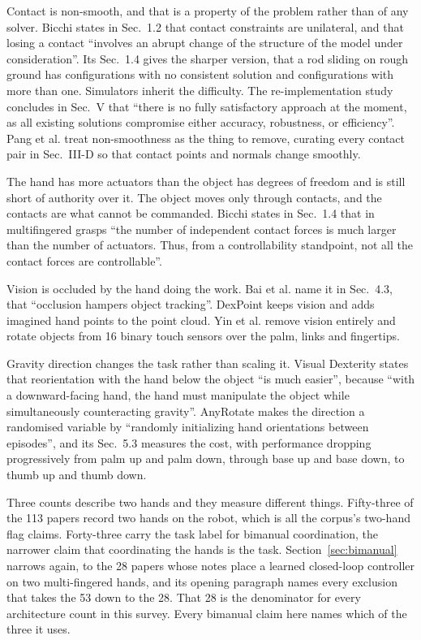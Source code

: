 Contact is non-smooth, and that is a property of the problem rather than of any solver. Bicchi
\cite{bicchi_grasping_chapter_2001} states in Sec.~1.2 that contact constraints are unilateral,
and that losing a contact ``involves an abrupt change of the structure of the model under
consideration''. Its Sec.~1.4 gives the sharper version, that a rod sliding on rough ground has
configurations with no consistent solution and configurations with more than one. Simulators
inherit the difficulty. The re-implementation study \cite{contact_models_comparison_2023}
concludes in Sec.~V that ``there is no fully satisfactory approach at the moment, as all existing
solutions compromise either accuracy, robustness, or efficiency''. Pang et al.
\cite{pang_global_planning_2022} treat non-smoothness as the thing to remove, curating every
contact pair in Sec.~III-D so that contact points and normals change smoothly.

The hand has more actuators than the object has degrees of freedom and is still short of authority
over it. The object moves only through contacts, and the contacts are what cannot be commanded.
Bicchi \cite{bicchi_grasping_chapter_2001} states in Sec.~1.4 that in multifingered grasps ``the
number of independent contact forces is much larger than the number of actuators. Thus, from a
controllability standpoint, not all the contact forces are controllable''.

Vision is occluded by the hand doing the work. Bai et al. \cite{bai_unified_manip_survey_2025}
name it in Sec.~4.3, that ``occlusion hampers object tracking''. DexPoint \cite{dexpoint_2022}
keeps vision and adds imagined hand points to the point cloud. Yin et al.
\cite{rotating_without_seeing_2023} remove vision entirely and rotate objects from 16 binary touch
sensors over the palm, links and fingertips.

Gravity direction changes the task rather than scaling it. Visual Dexterity
\cite{visual_dexterity_2022} states that reorientation with the hand below the object ``is much
easier'', because ``with a downward-facing hand, the hand must manipulate the object while
simultaneously counteracting gravity''. AnyRotate \cite{anyrotate_2024} makes the direction a
randomised variable by ``randomly initializing hand orientations between episodes'', and its
Sec.~5.3 measures the cost, with performance dropping progressively from palm up and palm down,
through base up and base down, to thumb up and thumb down.

\label{sec:taxonomy:twohands}
Three counts describe
two hands and they measure different things. Fifty-three of the 113 papers record two
hands on the robot, which is all the corpus's two-hand flag claims. Forty-three carry the task
label for bimanual coordination, the narrower claim that coordinating the hands is the task.
Section~\ref{sec:bimanual} narrows again, to the 28 papers whose notes place a learned
closed-loop controller on two multi-fingered hands, and its opening paragraph names every
exclusion that takes the 53 down to the 28. That 28 is the denominator for every architecture
count in this survey. Every bimanual claim here names which of the three it uses.


